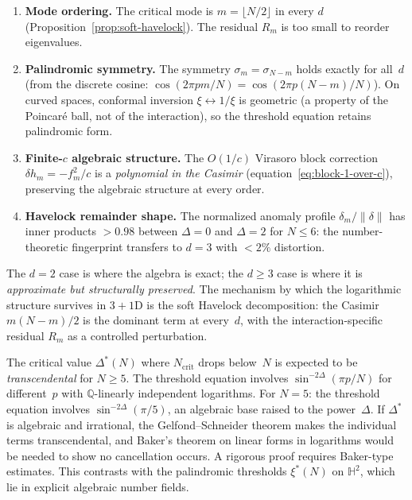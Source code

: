\begin{enumerate}
\item \textbf{Mode ordering.}
  The critical mode is $m = \lfloor N/2\rfloor$ in every $d$
  (Proposition~\ref{prop:soft-havelock}).
  The residual $R_m$ is too small to reorder eigenvalues.

\item \textbf{Palindromic symmetry.}
  The symmetry $\sigma_m = \sigma_{N-m}$ holds exactly for all~$d$
  (from the discrete cosine: $\cos(2\pi pm/N) = \cos(2\pi p(N{-}m)/N)$).
  On curved spaces, conformal inversion $\xi \leftrightarrow 1/\xi$ is
  geometric (a property of the Poincar\'e ball, not of the interaction),
  so the threshold equation retains palindromic form.

\item \textbf{Finite-$c$ algebraic structure.}
  The $O(1/c)$ Virasoro block correction
  $\delta h_m = -f_m^2/c$ is a \emph{polynomial in the Casimir}
  (equation~\ref{eq:block-1-over-c}),
  preserving the algebraic structure at every order.

\item \textbf{Havelock remainder shape.}
  The normalized anomaly profile $\delta_m/\|\delta\|$
  has inner products $> 0.98$ between $\Delta = 0$ and
  $\Delta = 2$ for $N \le 6$: the number-theoretic fingerprint
  transfers to $d = 3$ with $< 2\%$ distortion.
\end{enumerate}
The $d = 2$ case is where the algebra is exact;
the $d \ge 3$ case is where it is \emph{approximate but structurally
preserved}.  The mechanism by which the logarithmic structure
survives in $3{+}1$D is the soft Havelock decomposition:
the Casimir $m(N{-}m)/2$ is the dominant term at every~$d$, with
the interaction-specific residual $R_m$ as a controlled perturbation.

\begin{remark}
\label{rmk:transcendence}
The critical value $\Delta^*(N)$ where $N_{\mathrm{crit}}$ drops
below~$N$ is expected to be \emph{transcendental} for $N \ge 5$.
The threshold equation involves $\sin^{-2\Delta}(\pi p/N)$ for
different~$p$ with $\mathbb{Q}$-linearly independent logarithms.
For $N = 5$: the threshold equation involves
$\sin^{-2\Delta}(\pi/5)$, an algebraic base raised to the
power~$\Delta$.
If $\Delta^*$ is algebraic and irrational, the
Gelfond--Schneider theorem makes the individual terms
transcendental, and Baker's theorem on linear forms in
logarithms would be needed to show no cancellation occurs.
A rigorous proof requires Baker-type estimates.
This contrasts with the palindromic thresholds $\xi^*(N)$
on $\mathbb{H}^2$, which lie in explicit algebraic number fields.
\end{remark}

